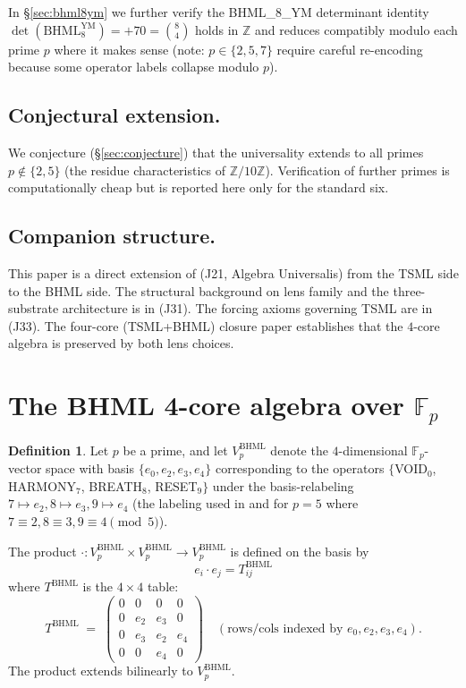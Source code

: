 \documentclass[11pt,reqno]{amsart}
\theoremstyle{plain}
\theoremstyle{definition}
\newtheorem{definition}[theorem]{Definition}
\theoremstyle{remark}
\newcommand{\Z}{\mathbb{Z}}
\newcommand{\F}{\mathbb{F}}
\newcommand{\BHML}{\mathrm{BHML}}
\begin{document}
In \S\ref{sec:bhml8ym} we further verify the BHML\_8\_YM determinant
identity $\det(\BHML_8^{\text{YM}}) = +70 = \binom{8}{4}$ holds in
$\Z$ and reduces compatibly modulo each prime $p$ where it makes
sense (note: $p \in \{2, 5, 7\}$ require careful re-encoding because
some operator labels collapse modulo $p$).

\subsection{Conjectural extension.}
We conjecture (\S\ref{sec:conjecture}) that the universality extends
to all primes $p \notin \{2, 5\}$ (the residue characteristics of
$\Z/10\Z$). Verification of further primes is computationally cheap
but is reported here only for the standard six.

\subsection{Companion structure.}
This paper is a direct extension of
\cite{SandersGishFpTSML} (J21, Algebra Universalis) from the TSML side
to the BHML side. The structural background on lens family and the
three-substrate architecture is in \cite{SandersGishThreeSubstrate}
(J31). The forcing axioms governing TSML are in
\cite{SandersForcing} (J33). The four-core (TSML+BHML) closure paper
\cite{SandersGishFourCore} establishes that the $4$-core algebra is
preserved by both lens choices.

\section{The BHML 4-core algebra over $\F_p$}
\label{sec:def}

\begin{definition}\label{def:bhml4core}
Let $p$ be a prime, and let $V_p^\BHML$ denote the $4$-dimensional
$\F_p$-vector space with basis $\{e_0, e_2, e_3, e_4\}$ corresponding
to the operators $\{$VOID$_0$, HARMONY$_7$, BREATH$_8$, RESET$_9\}$
under the basis-relabeling $7 \mapsto e_2, 8 \mapsto e_3,
9 \mapsto e_4$ (the labeling used in \cite{SandersGishFpTSML} and
\cite{SandersGishFourCore} for $p = 5$ where $7 \equiv 2,
8 \equiv 3, 9 \equiv 4 \pmod{5}$).

The product $\cdot : V_p^\BHML \times V_p^\BHML \to V_p^\BHML$ is
defined on the basis by
\[
e_i \cdot e_j = T_{ij}^\BHML
\]
where $T^\BHML$ is the $4 \times 4$ table:
\[
T^\BHML \;=\;
\begin{pmatrix}
0 & 0 & 0 & 0 \\
0 & e_2 & e_3 & 0 \\
0 & e_3 & e_2 & e_4 \\
0 & 0 & e_4 & 0
\end{pmatrix}
\quad (\text{rows/cols indexed by } e_0, e_2, e_3, e_4).
\]
The product extends bilinearly to $V_p^\BHML$.
\end{definition}
\end{document}
